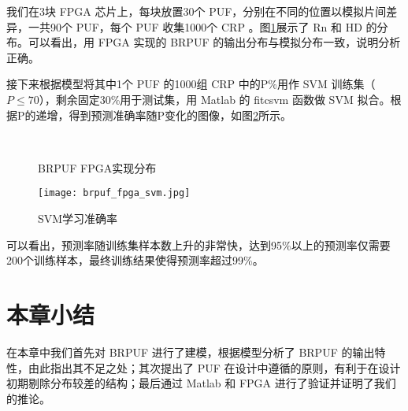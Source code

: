 我们在3块 FPGA 芯片上，每块放置30个 PUF，分别在不同的位置以模拟片间差异，一共90个 PUF，每个 PUF 收集1000个 CRP 。图\ref{fig:brpuffpga}展示了 Rn 和 HD 的分布。可以看出，用 FPGA 实现的 BRPUF 的输出分布与模拟分布一致，说明分析正确。

接下来根据模型将其中1个 PUF 的1000组 CRP 中的P\%用作 SVM 训练集（$ P\leq 70 $），剩余固定30\%用于测试集，用 Matlab 的 fitcsvm 函数做 SVM 拟合。根据P的递增，得到预测准确率随P变化的图像，如图\ref{fig:svmfit}所示。

\begin{figure}[htb!]
\centering
{}\\
\caption{BRPUF FPGA实现分布}
\label{fig:brpuffpga}
\end{figure}

\begin{figure}[htb!]
\centering
\texttt{[image: brpuf\_fpga\_svm.jpg]}
\caption{SVM学习准确率}
\label{fig:svmfit}
\end{figure}

可以看出，预测率随训练集样本数上升的非常快，达到95\%以上的预测率仅需要200个训练样本，最终训练结果使得预测率超过99\%。

\section{本章小结}
在本章中我们首先对 BRPUF 进行了建模，根据模型分析了 BRPUF 的输出特性，由此指出其不足之处；其次提出了 PUF 在设计中遵循的原则，有利于在设计初期剔除分布较差的结构；最后通过 Matlab 和 FPGA 进行了验证并证明了我们的推论。